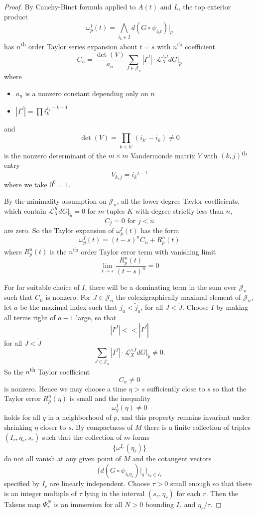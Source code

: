 \documentclass[11pt]{article}
\theoremstyle{definition}
\theoremstyle{remark}
\newcommand{\Ld}{\mathcal{L}}
\newcommand{\ts}{\textsuperscript}
\begin{document}
\begin{proof}
    By Cauchy-Binet formula applied to $A(t)$ and $L$, the top exterior product
    \[\omega_{p}^I(t)= \bigwedge_{i_k\in I} d(G\circ\psi_{i_kt})|_{p}
    \]
    has $n$\ts{th} order Taylor series expansion about $t=s$ with $n$\ts{th} coefficient
    \[C_n = \frac{\det(V)}{a_n} \sum_{J\in \mathcal{J}_n}|I^{J}|\cdot \Ld_{X}^{\wedge J}dG|_{\tilde{p}}\]
    where
    \begin{itemize}
    \item$a_n$ is a nonzero constant depending only on $n$
    \item $|I^J| = \prod i_k^{j_k-k+1}$
    \end{itemize}
    and \[\det(V) = \prod_{k<k'} (i_{k'}-i_k) \neq 0\]
    is the nonzero determinant of the $m\times m$ Vandermonde matrix $V$ with $(k,j)$\ts{th} entry
    \[V_{k, j}={i_k}^{j-1}\]
    where we take $0^0 = 1$.

     By the minimality assumption on $\mathcal{J}_n$, all the lower degree Taylor coefficients, which contain $\Ld_X^K dG|_{\tilde{p}} = 0$ for $m$-tuples $K$ with degree strictly less than $n$,
    \[C_j = 0 \text{ for $j<n$}\]
    are zero. So the Taylor expansion of $\omega_{p}^I(t)$ has the form
    \[\omega_{p}^I(t) = (t-s)^nC_n + R_p^n(t)\]
    where $R_p^n(t)$ is the $n$\ts{th} order Taylor error term with vanishing limit
    \[\lim_{t\to s}\frac{R_p^n(t)}{(t-s)^n} = 0\]

    For for suitable choice of $I$, there will be a dominating term in the sum over $\mathcal{J}_n$ such that $C_n$ is nonzero. For $\tilde{J}\in\mathcal{J}_n$ the colexigraphically maximal element of $\mathcal{J}_n$, let $a$ be the maximal index such that $j_a < \tilde{j}_a$, for all $J < \tilde{J}$. Choose $I$ by making all terms right of $a-1$ large, so that
    \[|I^{J}| << |I^{\tilde{J}}|\]
    for all $J < \tilde{J}$
    \[\sum_{J\in \mathcal{J}_n}|I^{J}|\cdot \Ld_{X}^{\wedge J}dG|_{\tilde{p}} \neq 0.\]
    So the $n$\ts{th} Taylor coefficient
    \[C_n \neq 0\]
    is nonzero.
     Hence we may choose a time $\eta>s$ sufficiently close to $s$ so that the Taylor error $R_p^n(\eta)$ is small and the inequality
    \[\omega_{q}^I(\eta) \neq 0\]
    holds for all $q$ in a neighborhood of $p$, and this property remains invariant under shrinking $\eta$ closer to $s$. By compactness of $M$ there is a finite collection of triples $(I_r, \eta_r, s_r)$ such that the collection of $m$-forms
    \[\{\omega^{I_r}(\eta_r)\}\]
    do not all vanish at any given point of $M$ and the cotangent vectors
    \[\{d(G\circ\psi_{i_k\eta_r})|_q\}_{i_k \in I_r}\]
    specified by $I_r$ are linearly independent. Choose $\tau>0$ small enough so that there is an integer multiple of $\tau$ lying in the interval $(s_r, \eta_r)$ for each $r$. Then the Takens map $\Psi_\tau^N$ is an immersion for all $N>0$ bounding $I_r$ and $\eta_r/\tau$.


\end{proof}
\end{document}
